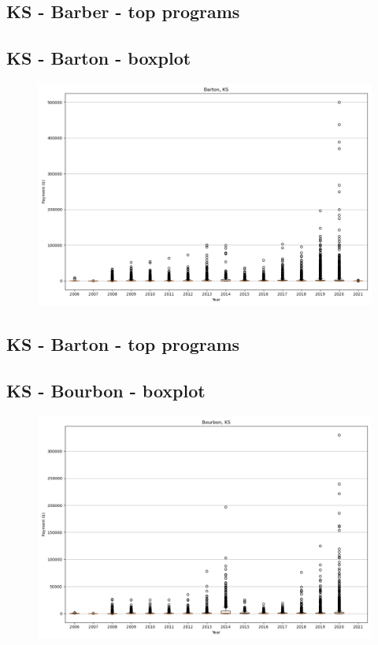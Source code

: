 \subsection*{KS - Barber - top programs}

\newpage
\subsection*{KS - Barton - boxplot}
\begin{figure}[h]
\centering
\includegraphics[width=7in]{../output/boxplots/counties/Barton-KS_boxplot.png}
\end{figure}


\subsection*{KS - Barton - top programs}

\newpage
\subsection*{KS - Bourbon - boxplot}
\begin{figure}[h]
\centering
\includegraphics[width=7in]{../output/boxplots/counties/Bourbon-KS_boxplot.png}
\end{figure}


